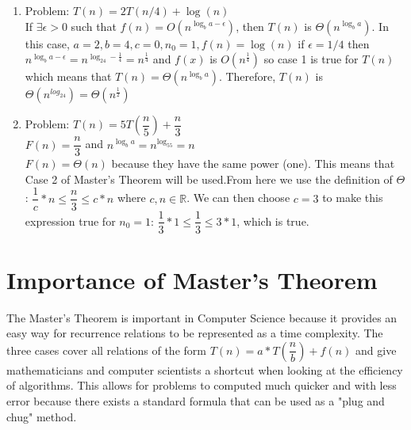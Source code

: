 \documentclass{article}
\begin{document}
\begin{enumerate}[4.1]
	\item 	Problem: $T(n) = 2T(n/4) +\log(n)$\\
		If $\exists \epsilon > 0$ such that $f(n) = O(n^{\log_ba-\epsilon})$, then $T(n)$ is $\Theta(n^{\log_ba})$. In this case, $a = 2, b = 4, c = 0, n_0 = 1, f(n) = \log(n)$ if $\epsilon = 1/4$ then $n^{\log_ba-\epsilon} = n^{\log_24-\frac{1}{4}} = n^{\frac{1}{4}}$ and $f(x)$ is $O(n^\frac{1}{4})$ so case 1 is true for $T(n)$ which means that $T(n) = \Theta(n^{\log_ba})$. Therefore, $T(n)$ is $\Theta(n^{log_24}) = \Theta(n^\frac{1}{2})$ 
	\item Problem: $T(n) = 5T(\dfrac{n}{5}) + \dfrac{n}{3}$\\
		$F(n) = \dfrac{n}{3}$ and $n^{\log_ba} = n^{\log_55} = n$\\
		$F(n) = \Theta(n)$ because they have the same power (one). This means that Case 2 of Master's Theorem will be used.From here we use the definition of $\Theta$: $\dfrac{1}{c}*n \leq \dfrac{n}{3} \leq c*n$ where $c, n \in \mathbb{R}$. We can then choose $c = 3$ to make this expression true for $n_0 = 1$: $\dfrac{1}{3}*1 \leq \dfrac{1}{3} \leq 3*1$, which is true.
\end{enumerate}

\clearpage
\header

\section*{Importance of Master's Theorem}

The Master's Theorem is important in Computer Science because it provides an easy way for recurrence relations to be represented as a time complexity. The three cases cover all relations of the form $T(n)=a*T(\dfrac{n}{b}) + f(n)$ and give mathematicians and computer scientists a shortcut when looking at the efficiency of algorithms. This allows for problems to computed much quicker and with less error because there exists a standard formula that can be used as a "plug and chug" method.
\end{document}
